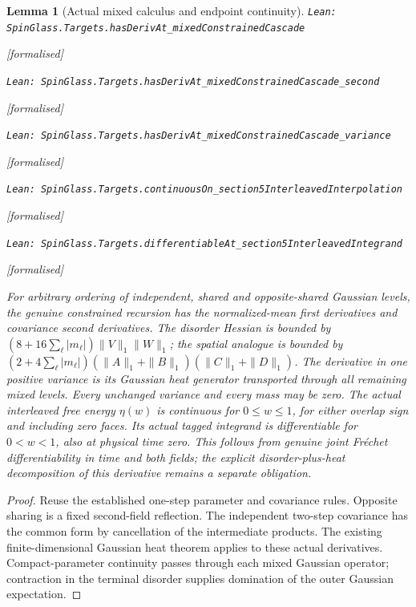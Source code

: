 \documentclass[11pt]{article}
\providecommand{\lean}[1]{\leavevmode\par\nopagebreak
  {\noindent\normalfont\footnotesize\raggedright\texttt{Lean: #1}\par}\nopagebreak}
\providecommand{\leanok}{\par\nopagebreak
  {\noindent\normalfont\footnotesize\textcolor{green!50!black}{[formalised]}\par}\nopagebreak}
\newtheorem{lemma}[theorem]{Lemma}
\begin{document}
\begin{lemma}[Actual mixed calculus and endpoint continuity]
\lean{SpinGlass.Targets.hasDerivAt\_mixedConstrainedCascade}\leanok
\lean{SpinGlass.Targets.hasDerivAt\_mixedConstrainedCascade\_second}\leanok
\lean{SpinGlass.Targets.hasDerivAt\_mixedConstrainedCascade\_variance}\leanok
\lean{SpinGlass.Targets.continuousOn\_section5InterleavedInterpolation}\leanok
\lean{SpinGlass.Targets.differentiableAt\_section5InterleavedIntegrand}\leanok
For arbitrary ordering of independent, shared and opposite-shared Gaussian
levels, the genuine constrained recursion has the normalized-mean first
derivatives and covariance second derivatives. The disorder Hessian is bounded
by $(8+16\sum_\ell |m_\ell|)\|V\|_1\|W\|_1$; the spatial analogue is bounded
by $(2+4\sum_\ell |m_\ell|)(\|A\|_1+\|B\|_1)(\|C\|_1+\|D\|_1)$.
The derivative in one positive variance is its Gaussian heat generator
transported through all remaining mixed levels. Every unchanged variance
and every mass may be zero. The actual interleaved free energy $\eta(w)$ is
continuous for $0\le w\le1$, for either overlap sign and including zero faces.
Its actual tagged integrand is differentiable for $0<w<1$, also at physical
time zero. This follows from genuine joint Fr\'echet differentiability in
time and both fields; the explicit disorder-plus-heat decomposition of this
derivative remains a separate obligation.
\end{lemma}
\begin{proof}
Reuse the established one-step parameter and covariance rules. Opposite
sharing is a fixed second-field reflection. The independent two-step
covariance has the common form by cancellation of the intermediate products.
The existing finite-dimensional Gaussian heat theorem applies to these actual
derivatives. Compact-parameter continuity passes through each mixed Gaussian
operator; contraction in the terminal disorder supplies domination of the
outer Gaussian expectation.
\end{proof}
\end{document}
